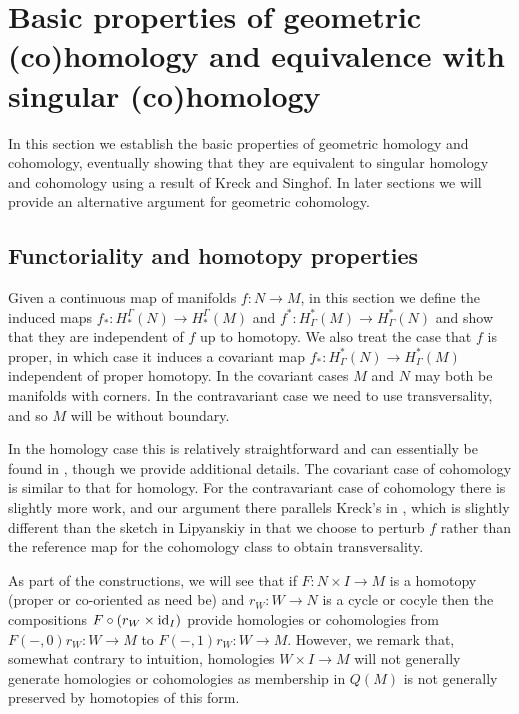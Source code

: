 


\section{Basic properties of geometric (co)homology and equivalence with singular (co)homology}\label{S: basic properties}


In this section we establish the basic properties of geometric homology and cohomology, eventually showing that they are equivalent to singular homology and cohomology using a result of Kreck and Singhof. In later sections we will provide an alternative argument for geometric cohomology.


\subsection{Functoriality and homotopy properties}\label{S: functoriality}


Given a continuous map of manifolds $f:N \to M$, in this section we define the induced maps $f_*:H_*^\Gamma(N) \to H_*^\Gamma(M)$ and $f^*:H^*_\Gamma(M) \to H^*_\Gamma(N)$ and show that they are independent of $f$ up to homotopy. We also treat the case that $f$ is proper, in which case it induces a covariant map $f_*:H^*_\Gamma(N) \to H^*_\Gamma(M)$ independent of proper homotopy. In the covariant cases $M$ and $N$ may both be manifolds with corners. In the contravariant case we need to use transversality, and so $M$ will be without boundary.



In the homology case this is relatively straightforward and can essentially be found in \cite[Section 6]{Lipy14}, though we provide additional details. The covariant case of cohomology is similar to that for homology. For the contravariant case of cohomology there is slightly more work, and our argument there parallels Kreck's in \cite{Krec10}, which is slightly different than the sketch in Lipyanskiy \cite[Section 6]{Lipy14} in that we choose to perturb $f$ rather than the reference map for the cohomology class to obtain transversality.

As part of the constructions, we will see that if $F:N \times I \to M$ is a homotopy (proper or co-oriented as need be) and $r_W \colon W \to N$ is a cycle or cocyle then the compositions $F\circ (r_W \times \mathrm{id}_I)$ provide homologies or cohomologies from $F(-,0)r_W \colon W \to M$ to $F(-,1)r_W \colon W \to M$. However, we remark that, somewhat contrary to intuition, homologies $W \times I \to M$ will not generally generate homologies or cohomologies as membership in $Q(M)$ is not generally preserved by homotopies of this form.



